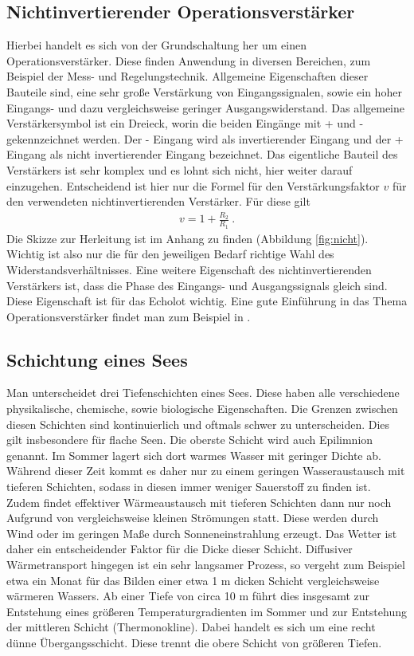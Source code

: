\documentclass[12pt,a4paper,titlepage,headinclude,bibtotoc]{scrartcl}
\numberwithin{equation}{subsection}
\begin{document}
\subsection{Nichtinvertierender Operationsverstärker}
\label{sec:teoverstaerker}
Hierbei handelt es sich von der Grundschaltung her um einen Operationsverstärker.
Diese finden Anwendung in diversen Bereichen, zum Beispiel der Mess- und Regelungstechnik. 
Allgemeine Eigenschaften dieser Bauteile sind, eine sehr große Verstärkung von Eingangssignalen, sowie ein hoher Eingangs- und dazu vergleichsweise geringer Ausgangswiderstand.
Das allgemeine Verstärkersymbol ist ein Dreieck, worin die beiden Eingänge mit + und - gekennzeichnet werden.
Der - Eingang wird als invertierender Eingang und der + Eingang als nicht invertierender Eingang bezeichnet.
Das eigentliche Bauteil des Verstärkers ist sehr komplex und es lohnt sich nicht, hier weiter darauf einzugehen.
Entscheidend ist hier nur die Formel für den Verstärkungsfaktor $v$ für den verwendeten nichtinvertierenden Verstärker. 
Für diese gilt
\begin{align}
 v = 1 + \frac{R_2}{R_1}~.\label{eq:verst}
\end{align}
Die Skizze zur Herleitung ist im Anhang zu finden (Abbildung \ref{fig:nicht}).
Wichtig ist also nur die für den jeweiligen Bedarf richtige Wahl des Widerstandsverhältnisses.
Eine weitere Eigenschaft des nichtinvertierenden Verstärkers ist, dass die Phase des Eingangs- und Ausgangssignals gleich sind.
Diese Eigenschaft ist für das Echolot wichtig. Eine gute Einführung in das Thema Operationsverstärker findet man zum Beispiel in \cite{op}.


\subsection{Schichtung eines Sees}

Man unterscheidet drei Tiefenschichten eines Sees.
Diese haben alle verschiedene physikalische, chemische, sowie biologische Eigenschaften.
Die Grenzen zwischen diesen Schichten sind kontinuierlich und oftmals schwer zu unterscheiden. 
Dies gilt insbesondere für flache Seen.
Die oberste Schicht wird auch Epilimnion genannt. 
Im Sommer lagert sich dort warmes Wasser mit geringer Dichte ab.
Während dieser Zeit kommt es daher nur zu einem geringen Wasseraustausch mit tieferen Schichten, sodass in diesen immer weniger Sauerstoff zu finden ist.
Zudem findet effektiver Wärmeaustausch mit tieferen Schichten dann nur noch Aufgrund von vergleichsweise kleinen Strömungen statt.
Diese werden durch Wind oder im geringen Maße durch Sonneneinstrahlung erzeugt. 
Das Wetter ist daher ein entscheidender Faktor für die Dicke dieser Schicht.
Diffusiver Wärmetransport hingegen ist ein sehr langsamer Prozess, so vergeht zum Beispiel etwa ein Monat für das Bilden einer etwa 1 m dicken Schicht vergleichsweise wärmeren Wassers.
Ab einer Tiefe von circa 10 m führt dies insgesamt zur Entstehung eines größeren Temperaturgradienten im Sommer und zur Entstehung der mittleren Schicht (Thermonokline).
Dabei handelt es sich um eine recht dünne Übergangsschicht.
Diese trennt die obere Schicht von größeren Tiefen. 
\newline
\end{document}
